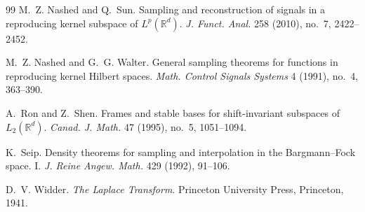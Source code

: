 \begin{thebibliography}{99}
M.~Z. Nashed and Q.~Sun.
\newblock Sampling and reconstruction of signals in a reproducing kernel
subspace of $L^p(\mathbb R^d)$.
\newblock \emph{J. Funct. Anal.} 258 (2010), no.~7, 2422--2452.

M.~Z. Nashed and G.~G. Walter.
\newblock General sampling theorems for functions in reproducing kernel
Hilbert spaces.
\newblock \emph{Math. Control Signals Systems} 4 (1991), no.~4, 363--390.

A.~Ron and Z.~Shen.
\newblock Frames and stable bases for shift-invariant subspaces of
$L_2(\mathbb R^d)$.
\newblock \emph{Canad. J. Math.} 47 (1995), no.~5, 1051--1094.

K.~Seip.
\newblock Density theorems for sampling and interpolation in the
Bargmann--Fock space. I.
\newblock \emph{J. Reine Angew. Math.} 429 (1992), 91--106.

D.~V. Widder.
\newblock \emph{The Laplace Transform}.
\newblock Princeton University Press, Princeton, 1941.

\end{thebibliography}
